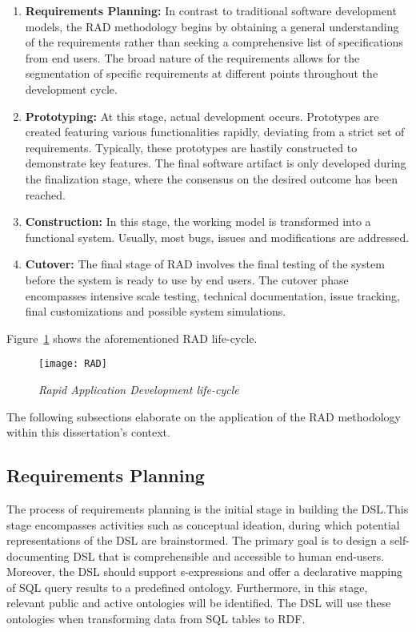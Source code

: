 \begin{enumerate}
\item \textbf{Requirements Planning:} In contrast to traditional software development models, the RAD methodology begins by obtaining a general understanding of the requirements rather than seeking a comprehensive list of specifications from end users.  The broad nature of the requirements allows for the segmentation of specific requirements at different points throughout the development cycle.

\item \textbf{Prototyping:} At this stage, actual development occurs.  Prototypes are created featuring various functionalities rapidly, deviating from a strict set of requirements.  Typically, these prototypes are hastily constructed to demonstrate key features.  The final software artifact is only developed during the finalization stage, where the consensus on the desired outcome has been reached.

\item \textbf{Construction:}  In this stage, the working model is transformed into a functional system.  Usually, most bugs, issues and modifications are addressed.

\item \textbf{Cutover:} The final stage of RAD involves the final testing of the system before the system is ready to use by end users.  The cutover phase encompasses intensive scale testing, technical documentation, issue tracking, final customizations and possible system simulations.
\end{enumerate}

Figure~\ref{fig:rad-lifecycle} shows the aforementioned RAD life-cycle.

\begin{figure}[H]
  \centering
  \texttt{[image: RAD]}
  \caption{\textit{Rapid Application Development life-cycle}}\label{fig:rad-lifecycle}
  \centering
\end{figure}

The following subsections elaborate on the application of the RAD methodology within this dissertation's context.

\subsection{Requirements Planning}

The process of requirements planning is the initial stage in building the DSL.\@  This stage encompasses activities such as conceptual ideation, during which potential representations of the DSL are brainstormed.  The primary goal is to design a self-documenting DSL that is comprehensible and accessible to human end-users.  Moreover, the DSL should support s-expressions and offer a declarative mapping of SQL query results to a predefined ontology.  Furthermore, in this stage, relevant public and active ontologies will be identified.  The DSL will use these ontologies when transforming data from SQL tables to RDF\@.

